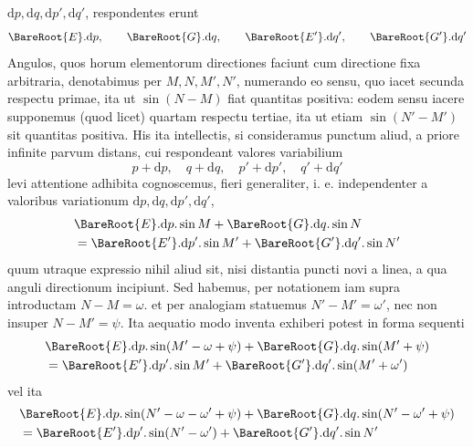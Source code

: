%
\(\mathrm{d}p,\mathrm{d}q,\mathrm{d}p',\mathrm{d}q'\), respondentes erunt
\[
\BareRoot{E}\mathord{.}\mathrm{d}p,\qquad\BareRoot{G}\mathord{.}\mathrm{d}q,\qquad\BareRoot{E'}\mathord{.}\mathrm{d}q',\qquad\BareRoot{G'}\mathord{.}\mathrm{d}q'
\]
Angulos, quos horum elementorum directiones faciunt cum directione fixa arbitraria, denotabimus per \(M,N,M',N'\), numerando eo sensu, quo iacet secunda respectu primae, ita ut \(\sin(N-M)\) fiat quantitas positiva: eodem sensu iacere supponemus (quod licet) quartam respectu tertiae, ita ut etiam \(\sin(N'-M')\) sit quantitas positiva. His ita intellectis, si consideramus punctum aliud, a priore infinite parvum distans, cui respondeant valores variabilium
\[
p+\mathrm{d}p,\quad q+\mathrm{d}q,\quad p'+\mathrm{d}p',\quad q'+\mathrm{d}q'
\]
levi attentione adhibita cognoscemus, fieri generaliter, i. e. independenter a valoribus variationum \(\mathrm{d}p,\mathrm{d}q,\mathrm{d}p',\mathrm{d}q'\),
\[
\begin{aligned}
&\BareRoot{E}\mathord{.}\mathrm{d}p\mathord{.}\sin M+\BareRoot{G}\mathord{.}\mathrm{d}q\mathord{.}\sin N\\
&=\BareRoot{E'}\mathord{.}\mathrm{d}p'\mathord{.}\sin M'+\BareRoot{G'}\mathord{.}\mathrm{d}q'\mathord{.}\sin N'
\end{aligned}
\]
quum utraque expressio nihil aliud sit, nisi distantia puncti novi a linea, a qua anguli directionum incipiunt. Sed habemus, per notationem iam supra introductam \(N-M=\omega\). et per analogiam statuemus \(N'-M'=\omega'\), nec non insuper \(N-M'=\psi\). Ita aequatio modo inventa exhiberi potest in forma sequenti
\[
\begin{aligned}
&\BareRoot{E}\mathord{.}\mathrm{d}p\mathord{.}\sin(M'-\omega+\psi)+\BareRoot{G}\mathord{.}\mathrm{d}q\mathord{.}\sin(M'+\psi)\\
&=\BareRoot{E'}\mathord{.}\mathrm{d}p'\mathord{.}\sin M'+\BareRoot{G'}\mathord{.}\mathrm{d}q'\mathord{.}\sin(M'+\omega')
\end{aligned}
\]
vel ita
\[
\begin{aligned}
&\BareRoot{E}\mathord{.}\mathrm{d}p\mathord{.}\sin(N'-\omega-\omega'+\psi)+\BareRoot{G}\mathord{.}\mathrm{d}q\mathord{.}\sin(N'-\omega'+\psi)\\
&=\BareRoot{E'}\mathord{.}\mathrm{d}p'\mathord{.}\sin(N'-\omega')+\BareRoot{G'}\mathord{.}\mathrm{d}q'\mathord{.}\sin N'
\end{aligned}
\]

